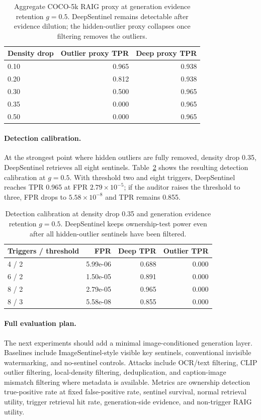 \documentclass[letterpaper,twocolumn,10pt]{article}
\begin{document}
\begin{table}[t]
\centering
\small
\begin{tabular}{lrr}
\toprule
Density drop & Outlier proxy TPR & Deep proxy TPR \\
\midrule
0.10 & 0.965 & 0.938 \\
0.20 & 0.812 & 0.938 \\
0.30 & 0.500 & 0.965 \\
0.35 & 0.000 & 0.965 \\
0.50 & 0.000 & 0.965 \\
\bottomrule
\end{tabular}
\caption{Aggregate COCO-5k RAIG proxy at generation evidence retention
$g=0.5$. DeepSentinel remains detectable after evidence dilution; the
hidden-outlier proxy collapses once filtering removes the outliers.}
\label{tab:raig-proxy}
\end{table}

\paragraph{Detection calibration.}
At the strongest point where hidden outliers are fully removed, density drop
0.35, DeepSentinel retrieves all eight sentinels. Table~\ref{tab:detection-cal}
shows the resulting detection calibration at $g=0.5$. With threshold two and
eight triggers, DeepSentinel reaches TPR 0.965 at FPR $2.79\times 10^{-5}$; if
the auditor raises the threshold to three, FPR drops to $5.58\times 10^{-8}$ and
TPR remains 0.855.

\begin{table}[t]
\centering
\small
\begin{tabular}{lrrr}
\toprule
Triggers / threshold & FPR & Deep TPR & Outlier TPR \\
\midrule
4 / 2 & 5.99e-06 & 0.688 & 0.000 \\
6 / 2 & 1.50e-05 & 0.891 & 0.000 \\
8 / 2 & 2.79e-05 & 0.965 & 0.000 \\
8 / 3 & 5.58e-08 & 0.855 & 0.000 \\
\bottomrule
\end{tabular}
\caption{Detection calibration at density drop 0.35 and generation evidence
retention $g=0.5$. DeepSentinel keeps ownership-test power even after all
hidden-outlier sentinels have been filtered.}
\label{tab:detection-cal}
\end{table}

\paragraph{Full evaluation plan.}
The next experiments should add a minimal image-conditioned generation layer.
Baselines include ImageSentinel-style visible key sentinels, conventional
invisible watermarking, and no-sentinel controls. Attacks include OCR/text
filtering, CLIP outlier filtering, local-density filtering, deduplication, and
caption-image mismatch filtering where metadata is available. Metrics are
ownership detection true-positive rate at fixed false-positive rate, sentinel
survival, normal retrieval utility, trigger retrieval hit rate, generation-side
evidence, and non-trigger RAIG utility.
\end{document}
